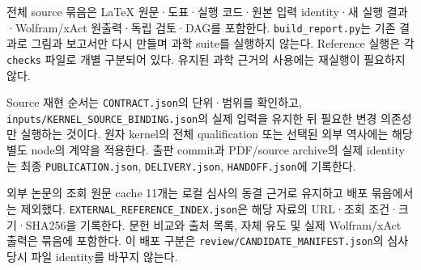 전체 source 묶음은 LaTeX 원문·도표·실행 코드·원본 입력 identity·새 실행 결과·Wolfram/xAct 원출력·독립 검토·DAG를 포함한다. \texttt{build\_report.py}는 기존 결과로 그림과 보고서만 다시 만들며 과학 suite를 실행하지 않는다. Reference 실행은 각 \texttt{checks} 파일로 개별 구분되어 있다. 유지된 과학 근거의 사용에는 재실행이 필요하지 않다.

Source 재현 순서는 \texttt{CONTRACT.json}의 단위·범위를 확인하고, \nolinkurl{inputs/KERNEL_SOURCE_BINDING.json}의 실제 입력을 유지한 뒤 필요한 변경 의존성만 실행하는 것이다. 원자 kernel의 전체 qualification 또는 선택된 외부 역사에는 해당 별도 node의 계약을 적용한다. 출판 commit과 PDF/source archive의 실제 identity는 최종 \texttt{PUBLICATION.json}, \texttt{DELIVERY.json}, \texttt{HANDOFF.json}에 기록한다.

외부 논문의 조회 원문 cache 11개는 로컬 심사의 동결 근거로 유지하고 배포 묶음에서는 제외했다. \nolinkurl{EXTERNAL_REFERENCE_INDEX.json}은 해당 자료의 URL·조회 조건·크기·SHA256을 기록한다. 문헌 비교와 출처 목록, 자체 유도 및 실제 Wolfram/xAct 출력은 묶음에 포함한다. 이 배포 구분은 \nolinkurl{review/CANDIDATE_MANIFEST.json}의 심사 당시 파일 identity를 바꾸지 않는다.
